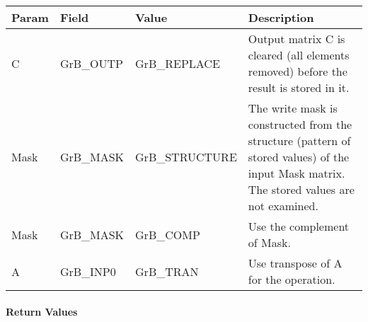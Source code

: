 \begin{itemize}[leftmargin=1.1in]
    \hspace*{-2em}\begin{tabular}{lllp{2.7in}}
        Param & Field  & Value & Description \\
        \hline
        {\sf C}    & {\sf GrB\_OUTP} & {\sf GrB\_REPLACE} & Output matrix {\sf C}
        is cleared (all elements removed) before the result is stored in it.\\

        {\sf Mask} & {\sf GrB\_MASK} & {\sf GrB\_STRUCTURE}   & The write mask is
        constructed from the structure (pattern of stored values) of the input
        {\sf Mask} matrix. The stored values are not examined.\\

        {\sf Mask} & {\sf GrB\_MASK} & {\sf GrB\_COMP}   & Use the 
        complement of {\sf Mask}. \\

        {\sf A}    & {\sf GrB\_INP0} & {\sf GrB\_TRAN}   & Use transpose of {\sf A}
        for the operation. \\
    \end{tabular}
\end{itemize}


\paragraph{Return Values}

